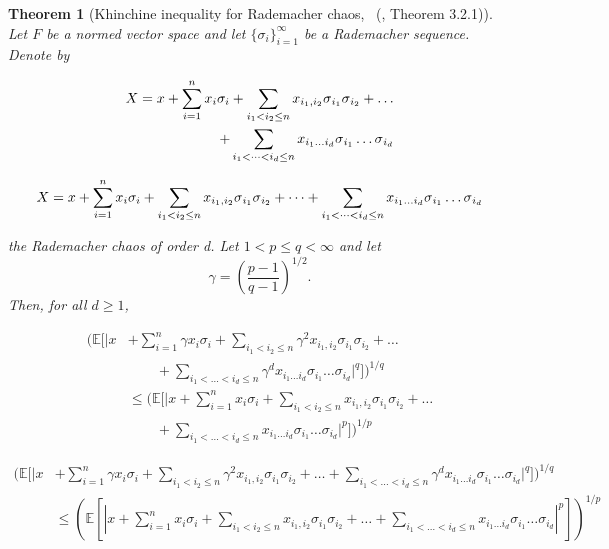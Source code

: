 \documentclass[letterpaper]{article} %
\def\DoubleColumn{}
\def\DoubleColumnEnd{}
\def\SingleColumn{}
\def\SingleColumnEnd{}
\newtheorem{theorem}{Theorem}
\newcommand{\E}{\mathbb{E}}
\newcommand{\rademacher}{\sigma}
\newcommand{\citett}[2]{\citeauthor{#2}\ (\citeyear{#2}, #1)}
\begin{document}
\begin{theorem}[Khinchine inequality for Rademacher chaos, {\citett{Theorem 3.2.1}{de2012decoupling}}]
    \label{th:kinchine_type_ineqaulity}
    Let $F$ be a normed vector space and let $\{\rademacher{}_i\}_{i=1}^\infty$ be a Rademacher sequence. Denote by
    \DoubleColumn
    \begin{align*}
        X=x+\sum_{i=1}^n x_i\rademacher_i+\sum_{i_1<i_2\le n}\linebreak x_{i_1,i_2}\rademacher{}_{i_1}\rademacher{}_{i_2}+\dots\\
        +\sum_{i_1<\dots<i_d\le n}x_{i_1\dots i_d}\rademacher{}_{i_1}\dots \rademacher{}_{i_d}        
    \end{align*}
    \DoubleColumnEnd
    \SingleColumn
    \begin{align*}
        X=x+\sum_{i=1}^n x_i\rademacher_i+\sum_{i_1<i_2\le n}\linebreak x_{i_1,i_2}\rademacher{}_{i_1}\rademacher{}_{i_2}+\dots+\sum_{i_1<\dots<i_d\le n}x_{i_1\dots i_d}\rademacher{}_{i_1}\dots \rademacher{}_{i_d}        
    \end{align*}
    \SingleColumnEnd
    the Rademacher chaos of order d. Let $1<p\le q<\infty$ and let
    \[\gamma=(\frac{p-1}{q-1})^{1/2}.\]
    Then, for all $d\ge 1$,
    \DoubleColumn
    \begin{align*}
        (\E[|x&+\sum_{i=1}^n \gamma x_i\rademacher_i+\sum_{i_1<i_2\le n}\gamma^2x_{i_1,i_2}\rademacher{}_{i_1}\rademacher{}_{i_2}+\dots\\
        &\qquad+\sum_{i_1<\dots<i_d\le n}\gamma^dx_{i_1\dots i_d}\rademacher{}_{i_1}\dots \rademacher{}_{i_d}|^q])^{1/q}\\
        &\le (\E[|x+\sum_{i=1}^n x_i\rademacher_i+\sum_{i_1<i_2\le n}x_{i_1,i_2}\rademacher{}_{i_1}\rademacher{}_{i_2}+\dots\\
        &\qquad+\sum_{i_1<\dots<i_d\le n}x_{i_1\dots i_d}\rademacher{}_{i_1}\dots \rademacher{}_{i_d}|^p])^{1/p}
    \end{align*}
    \DoubleColumnEnd
    \SingleColumn
    \begin{align*}
        (\E[|x&+\sum_{i=1}^n \gamma x_i\rademacher_i+\sum_{i_1<i_2\le n}\gamma^2x_{i_1,i_2}\rademacher{}_{i_1}\rademacher{}_{i_2}+\dots+\sum_{i_1<\dots<i_d\le n}\gamma^dx_{i_1\dots i_d}\rademacher{}_{i_1}\dots \rademacher{}_{i_d}|^q])^{1/q}\\
        &\le (\E[|x+\sum_{i=1}^n x_i\rademacher_i+\sum_{i_1<i_2\le n}x_{i_1,i_2}\rademacher{}_{i_1}\rademacher{}_{i_2}+\dots+\sum_{i_1<\dots<i_d\le n}x_{i_1\dots i_d}\rademacher{}_{i_1}\dots \rademacher{}_{i_d}|^p])^{1/p}
    \end{align*}
    \SingleColumnEnd
\end{theorem}
\end{document}
